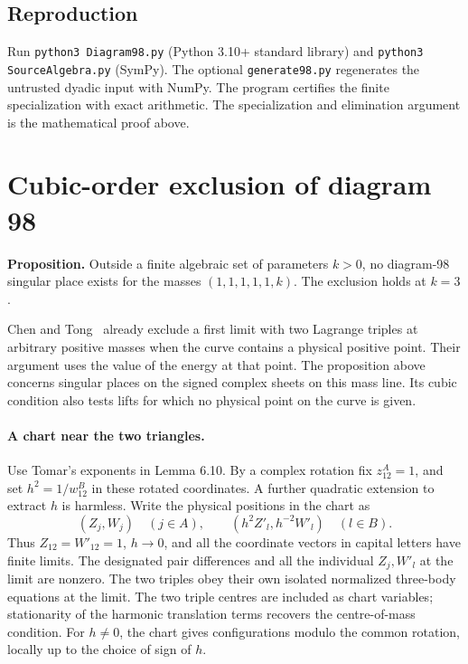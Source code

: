 \documentclass[11pt]{article}
\begin{document}
\subsection*{Reproduction}

Run \texttt{python3 Diagram98.py} (Python 3.10+ standard library) and \texttt{python3 SourceAlgebra.py} (SymPy). The optional \texttt{generate98.py} regenerates the untrusted dyadic input with NumPy. The program certifies the finite specialization with exact arithmetic. The specialization and elimination argument is the mathematical proof above.

\section{Cubic-order exclusion of diagram 98}

\textbf{Proposition.} Outside a finite algebraic set of parameters
\(k>0\), no diagram-98 singular place exists for the masses
\((1,1,1,1,1,k)\). The exclusion holds at \(k=3\).

Chen and Tong~\cite[Prop.~5.21]{CT} already exclude a first limit with
two Lagrange triples at arbitrary positive masses when the curve contains
a physical positive point. Their argument uses the value of the energy
at that point. The proposition above concerns singular places on the
signed complex sheets on this mass line. Its cubic condition also tests
lifts for which no physical point on the curve is given.

\paragraph{A chart near the two triangles.}
Use Tomar's exponents in Lemma 6.10. By a complex rotation fix
\(z^A_{12}=1\), and set \(h^2=1/w^B_{12}\) in these rotated
coordinates. A further quadratic extension to extract \(h\) is harmless.
Write the physical positions in the chart as
\[
 (Z_j,W_j)\quad(j\in A),\qquad (h^2 Z'_l,h^{-2} W'_l)\quad(l\in B).
\]
Thus \(Z_{12}=W'_{12}=1\), \(h\to0\), and all the coordinate
vectors in capital letters have finite limits. The designated pair
differences and all the individual \(Z_j,W'_l\) at the limit are nonzero.
The two triples obey their own isolated normalized three-body equations at
the limit. The two triple centres are included as chart variables; stationarity of the harmonic translation terms recovers the centre-of-mass condition. For \(h\ne0\),
the chart gives configurations modulo the common rotation, locally up
to the choice of sign of \(h\).
\end{document}
